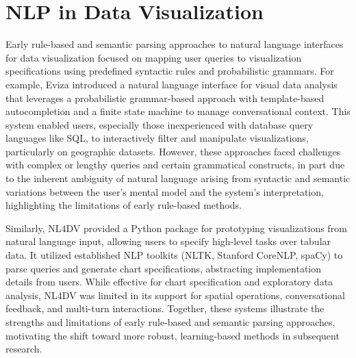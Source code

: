 \section{NLP in Data Visualization}


Early rule-based and semantic parsing approaches to natural language interfaces for data visualization focused on mapping user queries to visualization specifications using predefined syntactic rules and probabilistic grammars. For example, Eviza \citep{Setlur2016Eviza} introduced a natural language interface for visual data analysis that leverages a probabilistic grammar-based approach with template-based autocompletion and a finite state machine to manage conversational context. This system enabled users, especially those inexperienced with database query languages like SQL, to interactively filter and manipulate visualizations, particularly on geographic datasets. However, these approaches faced challenges with complex or lengthy queries and certain grammatical constructs, in part due to the inherent ambiguity of natural language arising from syntactic and semantic variations between the user's mental model and the system's interpretation, highlighting the limitations of early rule-based methods.

Similarly, NL4DV \citep{Narechania2021NL4DV} provided a Python package for prototyping visualizations from natural language input, allowing users to specify high-level tasks over tabular data. It utilized established NLP toolkits (NLTK, Stanford CoreNLP, spaCy) to parse queries and generate chart specifications, abstracting implementation details from users. While effective for chart specification and exploratory data analysis, NL4DV was limited in its support for spatial operations, conversational feedback, and multi-turn interactions. Together, these systems illustrate the strengths and limitations of early rule-based and semantic parsing approaches, motivating the shift toward more robust, learning-based methods in subsequent research.




